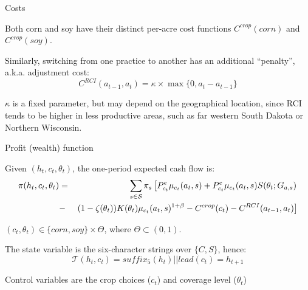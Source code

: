 \documentclass[notes,11pt, aspectratio=169]{beamer}
\newenvironment{wideitemize}{\itemize\addtolength{\itemsep}{10pt}}{\enditemize}
\begin{document}
\begin{frame}{Costs}
    \begin{wideitemize}
        \item Both corn and soy have their distinct per-acre cost functions $C^{crop}(corn)$ and $C^{crop}(soy)$.
        \item Similarly, switching from one practice to another has an additional ``penalty'', a.k.a. adjustment cost:
        \begin{equation}
             C^{RCI}(a_{t-1},a_{t})=\kappa\times \max\{0,a_{t}-a_{t-1}\}
        \end{equation}
        \item $\kappa$ is a fixed parameter, but may depend on the geographical location, since RCI tends to be higher in less productive areas, such as far western South Dakota or Northern Wisconsin.
    \end{wideitemize}
\end{frame}

\begin{frame}{Profit (wealth) function}
    \begin{wideitemize}
        \item Given $(h_{t},c_{t},\theta_{t})$, the one-period expected cash flow is:
        \begin{eqnarray}
             \pi(h_{t},c_{t},\theta_{t}) &=& \sum_{s\in \mathcal{S}}\pi_{s}\left[P_{c_{t}}^{e}\mu_{c_{t}}(a_{t},s)+P_{c_{t}}^{e}\mu_{c_{t}}(a_{t},s)S(\theta_{t};G_{a,s})\right.\notag\\ 
             &-& \left. (1-\zeta(\theta_{t}))K(\theta_{t})\mu_{c_{t}}(a_{t},s)^{1+\beta}-C^{crop}(c_{t})-C^{RCI}(a_{t-1},a_{t})\right]
        \end{eqnarray}
        \item $(c_{t}, \theta_{t})\in \{corn, soy\}\times \Theta$, where $\Theta\subset (0,1)$.
        \item The state variable is the six-character strings over $\{C,S\}$, hence:
        \begin{equation}
            \mathcal{T}(h_{t},c_{t})=suffix_{5}(h_{t})||lead(c_{t})=h_{t+1}
        \end{equation}
        \item Control variables are the crop choices ($c_{t}$) and coverage level ($\theta_{t}$)
    \end{wideitemize}
\end{frame}
\end{document}
